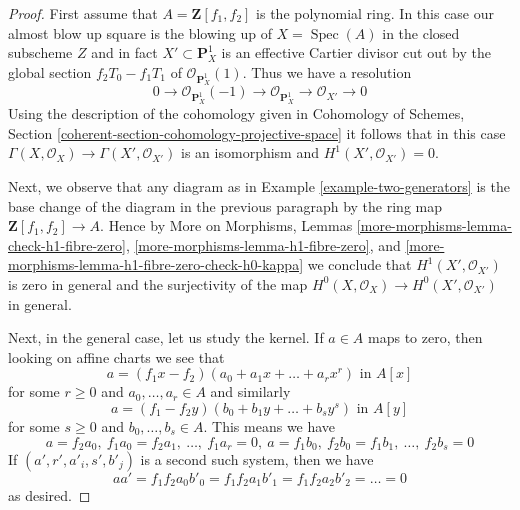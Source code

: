 \documentclass[10pt,a4paper]{amsart}
\theoremstyle{plain}
\theoremstyle{definition}
\theoremstyle{remark}
\numberwithin{equation}{subsection}
\def\Spec{\mathop{\mathrm{Spec}}}
\begin{document}
\begin{proof}
First assume that $A = \mathbf{Z}[f_1, f_2]$ is the polynomial ring.
In this case our almost blow up square is the blowing up of $X = \Spec(A)$
in the closed subscheme $Z$ and in fact $X' \subset \mathbf{P}^1_X$
is an effective Cartier divisor cut out by the global section
$f_2T_0 - f_1 T_1$ of $\mathcal{O}_{\mathbf{P}^1_X}(1)$.
Thus we have a resolution
$$
0 \to
\mathcal{O}_{\mathbf{P}^1_X}(-1) \to
\mathcal{O}_{\mathbf{P}^1_X} \to
\mathcal{O}_{X'} \to
0
$$
Using the description of the cohomology given in
Cohomology of Schemes, Section
\ref{coherent-section-cohomology-projective-space}
it follows that in this case
$\Gamma(X, \mathcal{O}_X) \to \Gamma(X', \mathcal{O}_{X'})$
is an isomorphism and $H^1(X', \mathcal{O}_{X'}) = 0$.

\medskip\noindent
Next, we observe that any diagram as in Example \ref{example-two-generators}
is the base change of the diagram in the previous paragraph by the
ring map $\mathbf{Z}[f_1, f_2] \to A$. Hence by More on Morphisms, Lemmas
\ref{more-morphisms-lemma-check-h1-fibre-zero},
\ref{more-morphisms-lemma-h1-fibre-zero}, and
\ref{more-morphisms-lemma-h1-fibre-zero-check-h0-kappa}
we conclude that $H^1(X', \mathcal{O}_{X'})$ is zero in general
and the surjectivity of the map
$H^0(X, \mathcal{O}_X) \to H^0(X', \mathcal{O}_{X'})$ in general.

\medskip\noindent
Next, in the general case, let us study the kernel. If
$a \in A$ maps to zero, then looking on affine charts
we see that
$$
a = (f_1x - f_2)(a_0 + a_1x + \ldots + a_rx^r)\text{ in }A[x]
$$
for some $r \geq 0$ and $a_0, \ldots, a_r \in A$ and similarly
$$
a = (f_1 - f_2y)(b_0 + b_1y + \ldots + b_s y^s)\text{ in }A[y]
$$
for some $s \geq 0$ and $b_0, \ldots, b_s \in A$. This means we
have
$$
a = f_2 a_0,\ f_1 a_0 = f_2 a_1,\ \ldots,\ f_1 a_r = 0,
\ a = f_1 b_0,\ f_2 b_0 = f_1 b_1,\ \ldots,\ f_2 b_s = 0
$$
If $(a', r', a'_i, s', b'_j)$ is a second such system, then we have
$$
aa' = f_1f_2a_0b'_0 = f_1f_2a_1b'_1 = f_1f_2a_2b'_2 = \ldots = 0
$$
as desired.
\end{proof}
\end{document}

